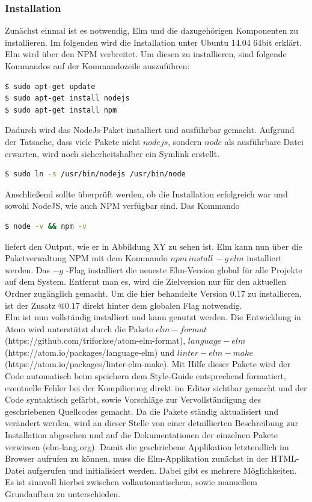 \subsubsection{Installation}
\label{sec:Installation}
Zunächst einmal ist es notwendig, Elm und die dazugehörigen Komponenten zu installieren. Im folgenden wird die Installation unter Ubuntu 14.04 64bit erklärt.
Elm wird über den NPM verbreitet. Um diesen zu installieren, sind folgende Kommandos auf der Kommandozeile auszuführen:

\begin{lstlisting}[language=bash]
$ sudo apt-get update
$ sudo apt-get install nodejs
$ sudo apt-get install npm
\end{lstlisting}

Dadurch wird das NodeJs-Paket installiert und ausführbar gemacht. Aufgrund der Tatsache, dass viele Pakete nicht $nodejs$, sondern $node$ als ausführbare Datei erwarten, wird noch sicherheitshalber ein Symlink erstellt.

\begin{lstlisting}[language=bash]
$ sudo ln -s /usr/bin/nodejs /usr/bin/node
\end{lstlisting}
Anschließend sollte überprüft werden, ob die Installation erfolgreich war und sowohl NodeJS, wie auch NPM verfügbar sind. Das Kommando \begin{lstlisting}[language=bash]
$ node -v && npm -v
\end{lstlisting}
liefert den Output, wie er in Abbildung XY zu sehen ist. Elm kann nun über die Paketverwaltung NPM mit dem Kommando 
$npm\,install\,-g\,elm$ installiert werden. Das $-g$ -Flag installiert die neueste Elm-Version global für alle Projekte auf dem System. Entfernt man es, wird die Zielversion nur für den aktuellen Ordner zugänglich gemacht. Um die hier behandelte Version 0.17 zu installieren, ist der Zusatz $@0.17$ direkt hinter dem globalen Flag notwendig.\\
Elm ist nun vollständig installiert und kann genutzt werden. Die Entwicklung in Atom wird unterstützt durch die Pakete $elm-format$\\ (https://github.com/triforkse/atom-elm-format), $language-elm$\\ (https://atom.io/packages/language-elm) und {$linter-elm-make$}\\ (https://atom.io/packages/linter-elm-make). Mit Hilfe dieser Pakete wird der Code automatisch beim speichern dem Style-Guide entsprechend formatiert, eventuelle Fehler bei der Kompilierung direkt im Editor sichtbar gemacht und der Code syntaktisch gefärbt, sowie Vorschläge zur Vervollständigung des geschriebenen Quellcodes gemacht. Da die Pakete ständig aktualisiert und verändert werden, wird an dieser Stelle von einer detaillierten Beschreibung zur Installation abgesehen und auf die Dokumentationen der einzelnen Pakete verwiesen (elm-lang.org).
Damit die geschriebene Applikation letztendlich im Browser aufrufen zu können, muss die Elm-Applikation zunächst in der HTML-Datei aufgerufen und initialisiert werden. Dabei gibt es mehrere Möglichkeiten. Es ist sinnvoll hierbei zwischen vollautomatischem, sowie manuellem Grundaufbau zu unterschieden.
